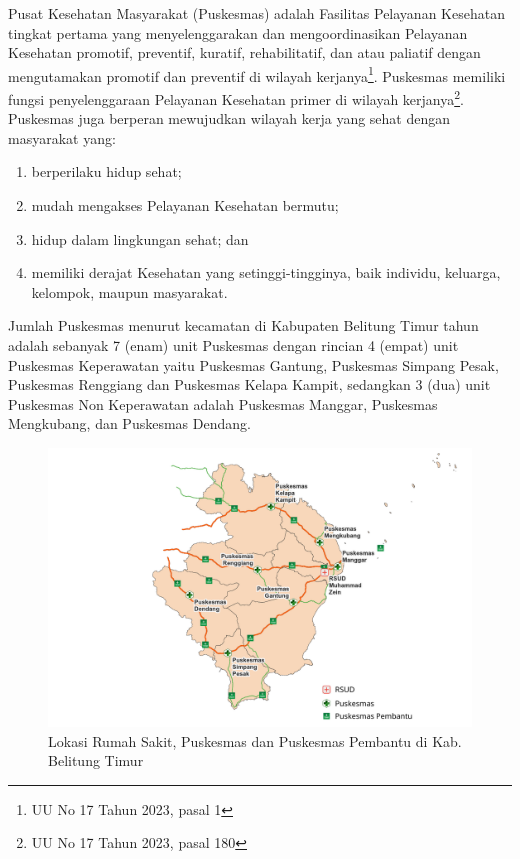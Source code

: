 Pusat Kesehatan Masyarakat (Puskesmas) adalah Fasilitas Pelayanan Kesehatan tingkat pertama yang menyelenggarakan dan mengoordinasikan
Pelayanan Kesehatan promotif, preventif, kuratif, rehabilitatif, dan atau paliatif dengan mengutamakan promotif dan preventif di wilayah kerjanya\footnote{UU No 17 Tahun 2023, pasal 1}. Puskesmas memiliki fungsi penyelenggaraan Pelayanan Kesehatan primer di wilayah kerjanya\footnote{UU No 17 Tahun 2023, pasal 180}. Puskesmas juga berperan mewujudkan wilayah kerja yang sehat dengan masyarakat yang:
\begin{enumerate}[label=\alph*]
	\item berperilaku hidup sehat;
	\item mudah mengakses Pelayanan Kesehatan bermutu;
	\item hidup dalam lingkungan sehat; dan
	\item memiliki derajat Kesehatan yang setinggi-tingginya, baik individu, keluarga, kelompok, maupun masyarakat.
\end{enumerate}

Jumlah Puskesmas menurut kecamatan di Kabupaten Belitung Timur tahun \tP adalah sebanyak 7 (enam) unit Puskesmas dengan rincian 4 (empat) unit Puskesmas Keperawatan yaitu Puskesmas Gantung, Puskesmas Simpang Pesak, Puskesmas Renggiang dan Puskesmas Kelapa Kampit, sedangkan 3 (dua) unit Puskesmas Non Keperawatan adalah Puskesmas Manggar, Puskesmas Mengkubang, dan Puskesmas Dendang.

\begin{figure}[H]
	\centering
	\includegraphics[width=\textwidth]{bab_02/bab_02_01_petaFaskes}	
	\caption{Lokasi Rumah Sakit, Puskesmas dan Puskesmas Pembantu di Kab. Belitung Timur}
	\label{fig:peta-puskesmas-rs}
\end{figure}

